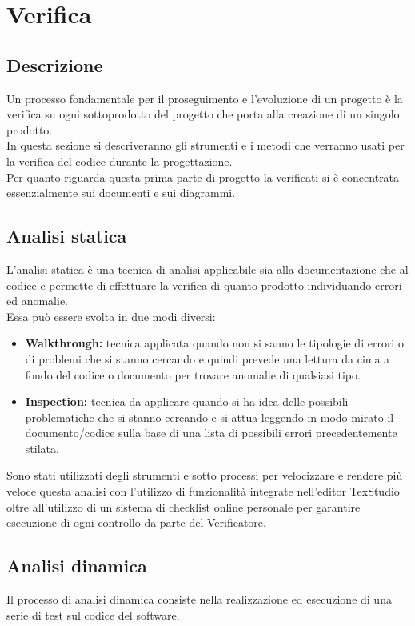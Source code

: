 \documentclass[NormeDiProgetto.tex]{subfiles}
\begin{document}
	\section{Verifica}
	
	\subsection{Descrizione}
	Un processo fondamentale per il proseguimento e l'evoluzione di un progetto è la verifica su ogni sottoprodotto del progetto che porta alla creazione di un singolo prodotto.\\
	In questa sezione si descriveranno gli strumenti e i metodi che verranno usati per la verifica del codice durante la progettazione.\\
	Per quanto riguarda questa prima parte di progetto la verificati si è concentrata essenzialmente sui documenti e sui diagrammi.
	
	\subsection{Analisi statica}
	L'analisi statica è una tecnica di analisi applicabile sia alla documentazione che al codice e permette di effettuare la verifica di quanto prodotto individuando errori ed anomalie.\\
	Essa può essere svolta in due modi diversi:
		\begin{itemize}
			\item \textbf{Walkthrough:} tecnica applicata quando non si sanno le tipologie di errori o di problemi che si stanno cercando e quindi prevede una lettura da cima a fondo del codice o documento per trovare anomalie di qualsiasi tipo.			
			\item \textbf{Inspection:} tecnica da applicare quando si ha idea delle possibili problematiche che si stanno cercando e si attua leggendo in modo mirato il documento/codice sulla base di una lista di possibili errori precedentemente stilata.
		\end{itemize}
	Sono stati utilizzati degli strumenti e sotto processi per velocizzare e rendere più veloce questa analisi con l'utilizzo di funzionalità integrate nell'editor TexStudio oltre all'utilizzo di un sistema di checklist online personale per garantire esecuzione di ogni controllo da parte del Verificatore.
	
	\subsection{Analisi dinamica}
	Il processo di analisi dinamica consiste nella realizzazione ed esecuzione di una serie di test sul codice del software. 
	
\end{document}
